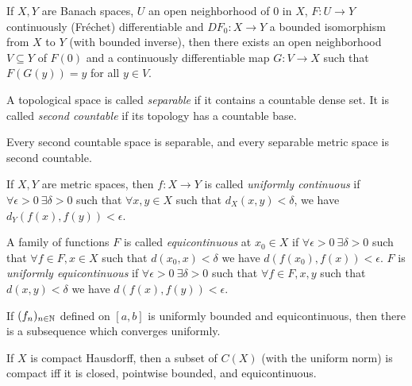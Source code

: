 \begin{cor} If $X,Y$ are Banach spaces, $U$ an open neighborhood of $0$ in $X$, $F:U\rightarrow Y$ continuously (Fr\'echet) differentiable and $DF_0:X\rightarrow Y$ a bounded isomorphism from $X$ to $Y$ (with bounded inverse), then there exists an open neighborhood $V \subseteq Y$ of $F(0)$ and a continuously differentiable map $G:V\rightarrow X$ such that $F(G(y)) = y$ for all $y \in V$.
\end{cor}

\begin{defn} A topological space is called \emph{separable} if it contains a countable dense set. It is called \emph{second countable} if its topology has a countable base.
\end{defn}

\begin{prop} Every second countable space is separable, and every separable metric space is second countable.
\end{prop}

\begin{defn} If $X,Y$ are metric spaces, then $f:X \rightarrow Y$ is called \emph{uniformly continuous} if $\forall \epsilon > 0\ \exists \delta > 0$ such that $\forall x,y \in X$ such that $d_X(x,y) < \delta$, we have $d_Y(f(x),f(y)) < \epsilon$.
\end{defn}

\begin{defn} A family of functions $F$ is called \emph{equicontinuous} at $x_0 \in X$ if $\forall \epsilon > 0\ \exists \delta > 0$ such that $\forall f \in F, x \in X$ such that $d(x_0,x) < \delta$ we have $d(f(x_0),f(x)) < \epsilon$. $F$ is \emph{uniformly equicontinuous} if $\forall \epsilon > 0\ \exists \delta > 0$ such that $\forall f \in F, x,y$ such that $d(x,y) < \delta$ we have $d(f(x),f(y)) < \epsilon$.
\end{defn}

\begin{thm} If $(f_n)_{n \in \mathbb{N}}$ defined on $[a,b]$ is uniformly bounded and equicontinuous, then there is a subsequence which converges uniformly.
\end{thm}

\begin{thm} If $X$ is compact Hausdorff, then a subset of $C(X)$ (with the uniform norm) is compact iff it is closed, pointwise bounded, and equicontinuous.
\end{thm}

